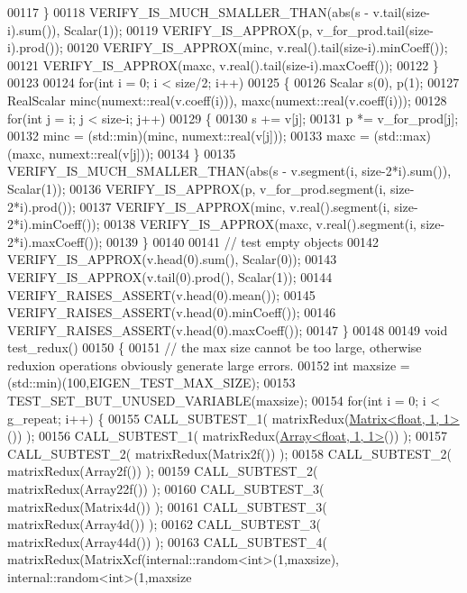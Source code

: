 \begin{DoxyCode}
00117     \}
00118     VERIFY\_IS\_MUCH\_SMALLER\_THAN(abs(s - v.tail(size-i).sum()), Scalar(1));
00119     VERIFY\_IS\_APPROX(p, v\_for\_prod.tail(size-i).prod());
00120     VERIFY\_IS\_APPROX(minc, v.real().tail(size-i).minCoeff());
00121     VERIFY\_IS\_APPROX(maxc, v.real().tail(size-i).maxCoeff());
00122   \}
00123 
00124   \textcolor{keywordflow}{for}(\textcolor{keywordtype}{int} i = 0; i < size/2; i++)
00125   \{
00126     Scalar s(0), p(1);
00127     RealScalar minc(numext::real(v.coeff(i))), maxc(numext::real(v.coeff(i)));
00128     \textcolor{keywordflow}{for}(\textcolor{keywordtype}{int} j = i; j < size-i; j++)
00129     \{
00130       s += v[j];
00131       p *= v\_for\_prod[j];
00132       minc = (std::min)(minc, numext::real(v[j]));
00133       maxc = (std::max)(maxc, numext::real(v[j]));
00134     \}
00135     VERIFY\_IS\_MUCH\_SMALLER\_THAN(abs(s - v.segment(i, size-2*i).sum()), Scalar(1));
00136     VERIFY\_IS\_APPROX(p, v\_for\_prod.segment(i, size-2*i).prod());
00137     VERIFY\_IS\_APPROX(minc, v.real().segment(i, size-2*i).minCoeff());
00138     VERIFY\_IS\_APPROX(maxc, v.real().segment(i, size-2*i).maxCoeff());
00139   \}
00140   
00141   \textcolor{comment}{// test empty objects}
00142   VERIFY\_IS\_APPROX(v.head(0).sum(),   Scalar(0));
00143   VERIFY\_IS\_APPROX(v.tail(0).prod(),  Scalar(1));
00144   VERIFY\_RAISES\_ASSERT(v.head(0).mean());
00145   VERIFY\_RAISES\_ASSERT(v.head(0).minCoeff());
00146   VERIFY\_RAISES\_ASSERT(v.head(0).maxCoeff());
00147 \}
00148 
00149 \textcolor{keywordtype}{void} test\_redux()
00150 \{
00151   \textcolor{comment}{// the max size cannot be too large, otherwise reduxion operations obviously generate large errors.}
00152   \textcolor{keywordtype}{int} maxsize = (std::min)(100,EIGEN\_TEST\_MAX\_SIZE);
00153   TEST\_SET\_BUT\_UNUSED\_VARIABLE(maxsize);
00154   \textcolor{keywordflow}{for}(\textcolor{keywordtype}{int} i = 0; i < g\_repeat; i++) \{
00155     CALL\_SUBTEST\_1( matrixRedux(\hyperlink{group___core___module_class_eigen_1_1_matrix}{Matrix<float, 1, 1>}()) );
00156     CALL\_SUBTEST\_1( matrixRedux(\hyperlink{group___core___module_class_eigen_1_1_array}{Array<float, 1, 1>}()) );
00157     CALL\_SUBTEST\_2( matrixRedux(Matrix2f()) );
00158     CALL\_SUBTEST\_2( matrixRedux(Array2f()) );
00159     CALL\_SUBTEST\_2( matrixRedux(Array22f()) );
00160     CALL\_SUBTEST\_3( matrixRedux(Matrix4d()) );
00161     CALL\_SUBTEST\_3( matrixRedux(Array4d()) );
00162     CALL\_SUBTEST\_3( matrixRedux(Array44d()) );
00163     CALL\_SUBTEST\_4( matrixRedux(MatrixXcf(internal::random<int>(1,maxsize), internal::random<int>(1,maxsize

\end{DoxyCode}
